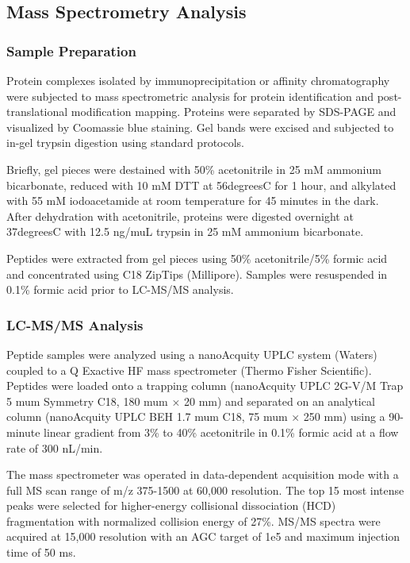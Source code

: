 \documentclass[11pt,a4paper]{article}
\begin{document}
\subsection{Mass Spectrometry Analysis}

\subsubsection{Sample Preparation}

Protein complexes isolated by immunoprecipitation or affinity chromatography were subjected to mass spectrometric analysis for protein identification and post-translational modification mapping. Proteins were separated by SDS-PAGE and visualized by Coomassie blue staining. Gel bands were excised and subjected to in-gel trypsin digestion using standard protocols.

Briefly, gel pieces were destained with 50\% acetonitrile in 25 mM ammonium bicarbonate, reduced with 10 mM DTT at 56degreesC for 1 hour, and alkylated with 55 mM iodoacetamide at room temperature for 45 minutes in the dark. After dehydration with acetonitrile, proteins were digested overnight at 37degreesC with 12.5 ng/muL trypsin in 25 mM ammonium bicarbonate.

Peptides were extracted from gel pieces using 50\% acetonitrile/5\% formic acid and concentrated using C18 ZipTips (Millipore). Samples were resuspended in 0.1\% formic acid prior to LC-MS/MS analysis.

\subsubsection{LC-MS/MS Analysis}

Peptide samples were analyzed using a nanoAcquity UPLC system (Waters) coupled to a Q Exactive HF mass spectrometer (Thermo Fisher Scientific). Peptides were loaded onto a trapping column (nanoAcquity UPLC 2G-V/M Trap 5 mum Symmetry C18, 180 mum × 20 mm) and separated on an analytical column (nanoAcquity UPLC BEH 1.7 mum C18, 75 mum × 250 mm) using a 90-minute linear gradient from 3\% to 40\% acetonitrile in 0.1\% formic acid at a flow rate of 300 nL/min.

The mass spectrometer was operated in data-dependent acquisition mode with a full MS scan range of m/z 375-1500 at 60,000 resolution. The top 15 most intense peaks were selected for higher-energy collisional dissociation (HCD) fragmentation with normalized collision energy of 27\%. MS/MS spectra were acquired at 15,000 resolution with an AGC target of 1e5 and maximum injection time of 50 ms.
\end{document}
